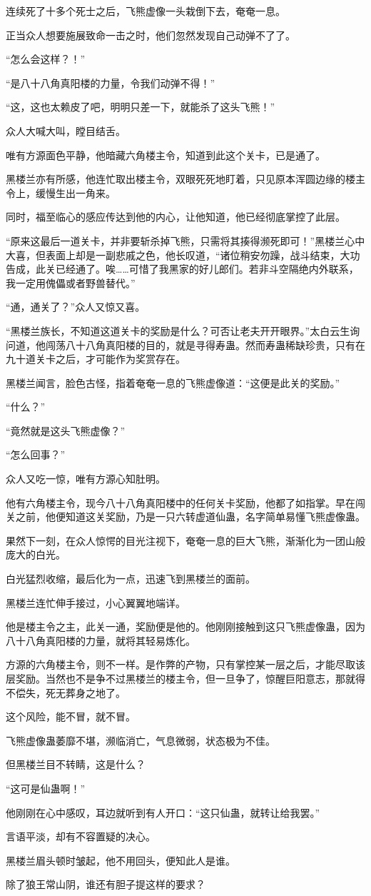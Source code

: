 \begin{this_body}
连续死了十多个死士之后，飞熊虚像一头栽倒下去，奄奄一息。

正当众人想要施展致命一击之时，他们忽然发现自己动弹不了了。

“怎么会这样？！”

“是八十八角真阳楼的力量，令我们动弹不得！”

“这，这也太赖皮了吧，明明只差一下，就能杀了这头飞熊！”

众人大喊大叫，瞠目结舌。

唯有方源面色平静，他暗藏六角楼主令，知道到此这个关卡，已是通了。

黑楼兰亦有所感，他连忙取出楼主令，双眼死死地盯着，只见原本浑圆边缘的楼主令上，缓慢生出一角来。

同时，福至临心的感应传达到他的内心，让他知道，他已经彻底掌控了此层。

“原来这最后一道关卡，并非要斩杀掉飞熊，只需将其揍得濒死即可！”黑楼兰心中大喜，但表面上却是一副悲戚之色，他长叹道，“诸位稍安勿躁，战斗结束，大功告成，此关已经通了。唉……可惜了我黑家的好儿郎们。若非斗空隔绝内外联系，我一定用傀儡或者野兽替代。”

“通，通关了？”众人又惊又喜。

“黑楼兰族长，不知道这道关卡的奖励是什么？可否让老夫开开眼界。”太白云生询问道，他闯荡八十八角真阳楼的目的，就是寻得寿蛊。然而寿蛊稀缺珍贵，只有在九十道关卡之后，才可能作为奖赏存在。

黑楼兰闻言，脸色古怪，指着奄奄一息的飞熊虚像道：“这便是此关的奖励。”

“什么？”

“竟然就是这头飞熊虚像？”

“怎么回事？”

众人又吃一惊，唯有方源心知肚明。

他有六角楼主令，现今八十八角真阳楼中的任何关卡奖励，他都了如指掌。早在闯关之前，他便知道这关奖励，乃是一只六转虚道仙蛊，名字简单易懂飞熊虚像蛊。

果然下一刻，在众人惊愕的目光注视下，奄奄一息的巨大飞熊，渐渐化为一团山般庞大的白光。

白光猛烈收缩，最后化为一点，迅速飞到黑楼兰的面前。

黑楼兰连忙伸手接过，小心翼翼地端详。

他是楼主令之主，此关一通，奖励便是他的。他刚刚接触到这只飞熊虚像蛊，因为八十八角真阳楼的力量，就将其轻易炼化。

方源的六角楼主令，则不一样。是作弊的产物，只有掌控某一层之后，才能尽取该层奖励。当然也不是争不过黑楼兰的楼主令，但一旦争了，惊醒巨阳意志，那就得不偿失，死无葬身之地了。

这个风险，能不冒，就不冒。

飞熊虚像蛊萎靡不堪，濒临消亡，气息微弱，状态极为不佳。

但黑楼兰目不转睛，这是什么？

“这可是仙蛊啊！”

他刚刚在心中感叹，耳边就听到有人开口：“这只仙蛊，就转让给我罢。”

言语平淡，却有不容置疑的决心。

黑楼兰眉头顿时皱起，他不用回头，便知此人是谁。

除了狼王常山阴，谁还有胆子提这样的要求？

\end{this_body}

